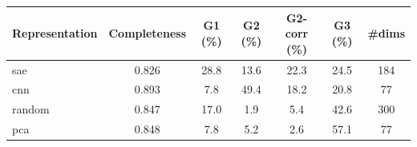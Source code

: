 \begin{tabular}{lcccccc}
\toprule
Representation & Completeness & G1 (\%) & G2 (\%) & G2-corr (\%) & G3 (\%) & \#dims \\
\midrule
sae & 0.826 & 28.8 & 13.6 & 22.3 & 24.5 & 184 \\
cnn & 0.893 & 7.8 & 49.4 & 18.2 & 20.8 & 77 \\
random & 0.847 & 17.0 & 1.9 & 5.4 & 42.6 & 300 \\
pca & 0.848 & 7.8 & 5.2 & 2.6 & 57.1 & 77 \\
\bottomrule
\end{tabular}